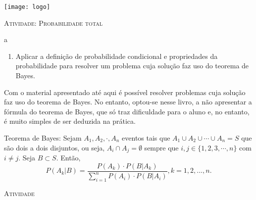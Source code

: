 \documentclass[10 pt,usenames,dvipsnames, oneside]{article}
\begin{document}
\begin{center}
  \begin{minipage}[l]{3cm}
\texttt{[image: logo]}    
\end{minipage}\hfill
\begin{minipage}[r]{.8\textwidth}
 {\Large \scshape Atividade: Probabilidade total}  
\end{minipage}
\end{center}
\vspace{.2cm}

\ifdefined\prof
\begin{objetivos}
\item a
\end{objetivos}

\begin{goals}
\begin{enumerate}
\item Aplicar a definição de probabilidade condicional e propriedades da probabilidade para resolver um problema cuja solução faz uso do teorema de Bayes.
\end{enumerate}

\tcblower

Com o material apresentado até aqui é possível resolver problemas cuja solução faz uso do teorema de Bayes. No entanto, optou-se nesse livro, a não apresentar a fórmula do teorema de Bayes, que só traz dificuldade para o aluno e, no entanto, é muito simples de ser deduzida na prática.

Teorema de Bayes: Sejam $A_1,A_2,\cdot,A_n$ eventos tais que $A_1\cup A_2\cup\cdots\cup A_n=S$ que são dois a dois disjuntos, ou seja, $A_i\cap A_j=\emptyset$ sempre que $i,j\in\{1,2,3,\cdots,n\}$ com $i\neq j$. Seja $B\subset S$. Então,
\begin{equation*}
P(A_k|B)=\dfrac{P(A_k)\cdot P(B|A_k)}{\displaystyle\sum^n_{i=1}P(A_i)\cdot P(B|A_i)}, k=1,2,...,n.
\end{equation*}
\end{goals}

\bigskip
\begin{center}
{\large \scshape Atividade}
\end{center}
\fi
\end{document}
